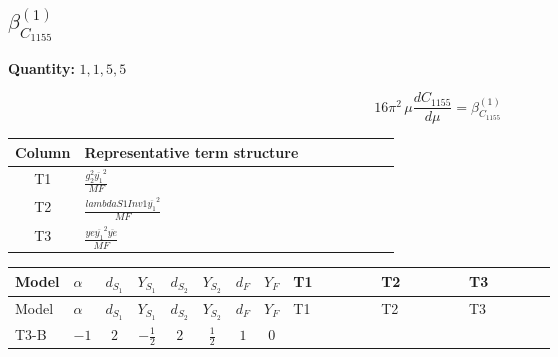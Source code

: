 \documentclass[8pt]{article}
\begin{document}
\begin{landscape}
\section*{$\beta_{C_{1155}}^{(1)}$}
\noindent\textbf{Quantity: }$\mathrm{1,1,5,5}$\par\smallskip
\[16\pi^2\,\mu\frac{d C_{1155}}{d\mu}=\beta_{C_{1155}}^{(1)}\]
\begin{center}
\begin{tabular}{@{}c >{\raggedright\arraybackslash}p{0.82\linewidth}@{}}
\toprule
Column & Representative term structure \\
\midrule
T1 & \(\displaystyle \frac{g_{2}^{2} \overline{y_{1}}^{2}}{MF}\) \\
\midrule
T2 & \(\displaystyle \frac{lambdaS1Inv1 \overline{y_{1}}^{2}}{MF}\) \\
\midrule
T3 & \(\displaystyle \frac{ye \overline{y_{1}}^{2} \overline{ye}}{MF}\) \\
\midrule
\bottomrule
\end{tabular}
\end{center}
\smallskip
\tiny
\begin{longtable}{@{}llcccccc >{\raggedright\arraybackslash}p{0.21\linewidth} >{\raggedright\arraybackslash}p{0.21\linewidth} >{\raggedright\arraybackslash}p{0.21\linewidth}@{}}
\toprule
Model & $\alpha$ & $d_{S_1}$ & $Y_{S_1}$ & $d_{S_2}$ & $Y_{S_2}$ & $d_F$ & $Y_F$ & T1 & T2 & T3 \\
\midrule
\endfirsthead
\toprule
Model & $\alpha$ & $d_{S_1}$ & $Y_{S_1}$ & $d_{S_2}$ & $Y_{S_2}$ & $d_F$ & $Y_F$ & T1 & T2 & T3 \\
\midrule
\endhead
T3-B & $-1$ & $2$ & $-\frac{1}{2}$ & $2$ & $\frac{1}{2}$ & $1$ & $0$ & \scriptsize\adjustbox{max width=\linewidth}{$\begin{gathered} - \frac{3 g_{2}^{2} \overline{y_{1}}^{2}}{4 MF}\end{gathered}$} & \scriptsize\adjustbox{max width=\linewidth}{$\begin{gathered} - \frac{lambdaS1Inv1 \overline{y_{1}}^{2}}{2 MF}\end{gathered}$} & \scriptsize\adjustbox{max width=\linewidth}{$\begin{gathered} \frac{ye \overline{y_{1}}^{2} \overline{ye}}{4 MF}\end{gathered}$} \\
\midrule
\bottomrule
\end{longtable}
\clearpage

\end{landscape}
\end{document}
